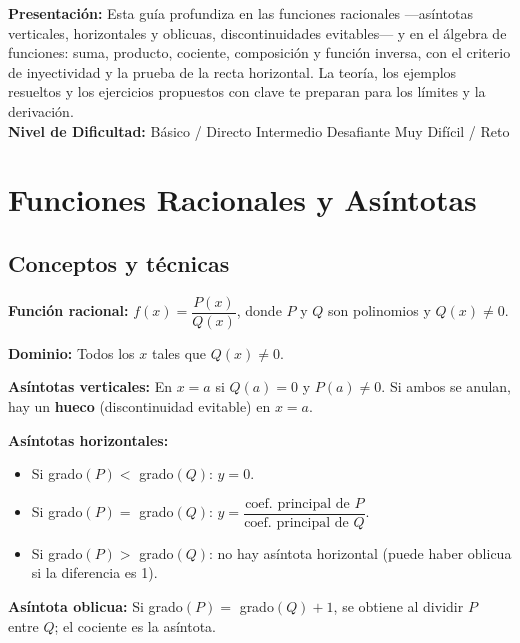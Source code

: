 \documentclass[12pt, letterpaper]{article}
\begin{document}

\vspace{4pt}
\begin{cuadroinfo}
  \small
  \textbf{Presentación:} Esta guía profundiza en las funciones racionales —asíntotas verticales, horizontales y oblicuas, discontinuidades evitables— y en el álgebra de funciones: suma, producto, cociente, composición y función inversa, con el criterio de inyectividad y la prueba de la recta horizontal. La teoría, los ejemplos resueltos y los ejercicios propuestos con clave te preparan para los límites y la derivación.
  \\[4pt]
  \textbf{Nivel de Dificultad:}\quad
  \facil{} Básico / Directo \quad
  \medio{} Intermedio \quad
  \dificil{} Desafiante \quad
  \muyDificil{} Muy Difícil / Reto
\end{cuadroinfo}

\vspace{8pt}

\section{Funciones Racionales y Asíntotas}

\subsection{Conceptos y técnicas}

\begin{cuadroteoria}
  \textbf{Función racional:} $f(x) = \dfrac{P(x)}{Q(x)}$, donde $P$ y $Q$ son polinomios y $Q(x) \neq 0$.

  \textbf{Dominio:} Todos los $x$ tales que $Q(x) \neq 0$.

  \textbf{Asíntotas verticales:} En $x = a$ si $Q(a) = 0$ y $P(a) \neq 0$. Si ambos se anulan, hay un \textbf{hueco} (discontinuidad evitable) en $x = a$.

  \textbf{Asíntotas horizontales:}
  \begin{itemize}[leftmargin=*]
    \item Si grado$(P) <$ grado$(Q)$: $y = 0$.
    \item Si grado$(P) =$ grado$(Q)$: $y = \dfrac{\text{coef. principal de } P}{\text{coef. principal de } Q}$.
    \item Si grado$(P) >$ grado$(Q)$: no hay asíntota horizontal (puede haber oblicua si la diferencia es 1).
  \end{itemize}

  \textbf{Asíntota oblicua:} Si grado$(P) =$ grado$(Q) + 1$, se obtiene al dividir $P$ entre $Q$; el cociente es la asíntota.
\end{cuadroteoria}
\end{document}
